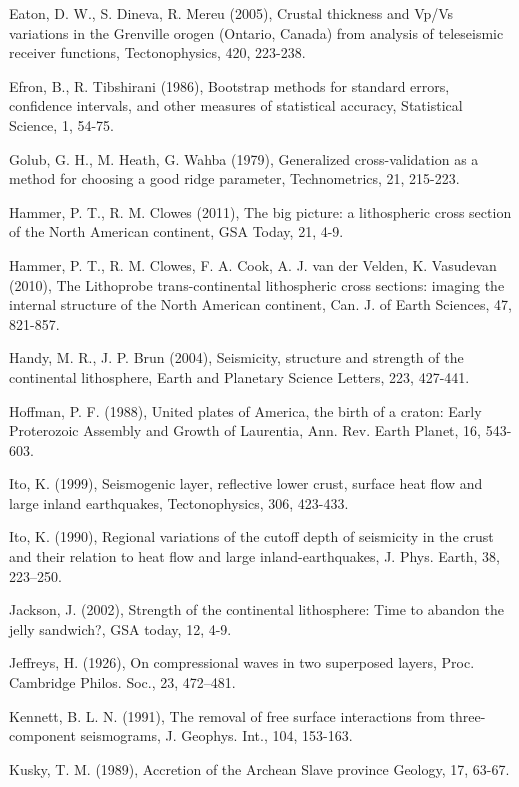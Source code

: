\documentclass[msc,oneside]{ubcthesis}
\begin{document}
\begin{thebibliography}{1}
\bibitem{} Eaton, D. W., S. Dineva, R. Mereu (2005), Crustal thickness and Vp/Vs variations in the Grenville orogen (Ontario, Canada) from analysis of teleseismic receiver functions, Tectonophysics, 420, 223-238.

\bibitem{} Efron, B., R. Tibshirani (1986), Bootstrap methods for standard errors, confidence intervals, and other measures of statistical accuracy, Statistical Science, 1, 54-75.

\bibitem{} Golub, G. H., M. Heath, G. Wahba (1979), Generalized cross-validation as a method for choosing a good ridge parameter, Technometrics, 21, 215-223.

\bibitem{} Hammer, P. T., R. M. Clowes (2011), The big picture: a lithospheric cross section of the North American continent, GSA Today, 21, 4-9.

\bibitem{} Hammer, P. T., R. M. Clowes, F. A. Cook, A. J. van der Velden, K. Vasudevan (2010), The Lithoprobe trans-continental lithospheric cross sections: imaging the internal structure of the North American continent, Can. J. of Earth Sciences, 47, 821-857.

\bibitem{} Handy, M. R.,  J. P. Brun (2004), Seismicity, structure and strength of the continental lithosphere, Earth and Planetary Science Letters, 223, 427-441.

\bibitem{} Hoffman, P. F. (1988), United plates of America, the birth of a craton: Early Proterozoic Assembly and Growth of Laurentia, Ann. Rev. Earth Planet, 16, 543-603.

\bibitem{} Ito, K. (1999), Seismogenic layer, reflective lower crust, surface heat flow and large inland earthquakes, Tectonophysics, 306, 423-433.

\bibitem{} Ito, K. (1990), Regional variations of the cutoff depth of seismicity in the crust and their relation to heat flow and large inland-earthquakes, J. Phys. Earth, 38, 223–250.

\bibitem{} Jackson, J. (2002), Strength of the continental lithosphere: Time to abandon the jelly sandwich?, GSA today, 12, 4-9.

\bibitem{} Jeffreys, H. (1926), On compressional waves in two superposed layers, Proc. Cambridge Philos. Soc., 23, 472–481.

\bibitem{} Kennett, B. L. N. (1991), The removal of free surface interactions from three-component seismograms, J. Geophys. Int., 104, 153-163.

\bibitem{} Kusky, T. M. (1989), Accretion of the Archean Slave province Geology, 17, 63-67.


\end{thebibliography}
\end{document}
